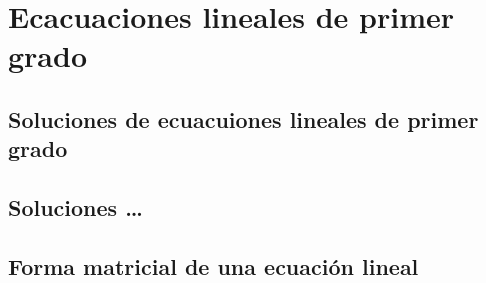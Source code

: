 \documentclass[
  11pt,
]{krantz}
\theoremstyle{definition}
\theoremstyle{definition}
\theoremstyle{definition}
\theoremstyle{definition}
\theoremstyle{remark}
\begin{document}
\hypertarget{ecacuaciones-lineales-de-primer-grado}{%
\chapter{Ecacuaciones lineales de primer grado}\label{ecacuaciones-lineales-de-primer-grado}}

\hypertarget{soluciones-de-ecuacuiones-lineales-de-primer-grado}{%
\section{Soluciones de ecuacuiones lineales de primer grado}\label{soluciones-de-ecuacuiones-lineales-de-primer-grado}}

\hypertarget{soluciones}{%
\section{Soluciones \ldots{}}\label{soluciones}}

\hypertarget{forma-matricial-de-una-ecuaciuxf3n-lineal}{%
\section{Forma matricial de una ecuación lineal}\label{forma-matricial-de-una-ecuaciuxf3n-lineal}}

  

\printindex
\end{document}
